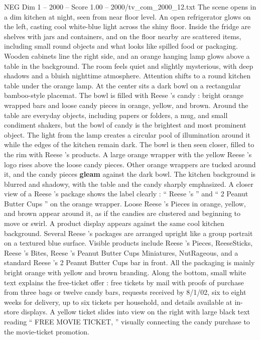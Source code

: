 \begin{textsample}{NEG Dim 1 – 2000 – Score 1.00 – 2000/tv\_com\_2000\_12.txt}  \label{ex:f1_neg_070}
The scene opens in a dim kitchen at night, seen from near floor level.
An open refrigerator glows on the left, casting cool white-blue light across the shiny floor.
Inside the fridge are shelves with jars and containers, and on the floor nearby are scattered items, including small round objects and what looks like spilled food or packaging.
Wooden cabinets line the right side, and an orange hanging lamp glows above a table in the background.
The room feels quiet and slightly mysterious, with deep shadows and a bluish nighttime atmosphere.
Attention shifts to a round kitchen table under the orange lamp.
At the center sits a dark bowl on a rectangular bamboo-style placemat.
The bowl is filled with Reese ’s candy : bright orange wrapped bars and loose candy pieces in orange, yellow, and brown.
Around the table are everyday objects, including papers or folders, a mug, and small condiment shakers, but the bowl of candy is the brightest and most prominent object.
The light from the lamp creates a circular pool of illumination around it while the edges of the kitchen remain dark.
The bowl is then seen closer, filled to the rim with Reese ’s products.
A large orange wrapper with the yellow Reese ’s logo rises above the loose candy pieces.
Other orange wrappers are tucked around it, and the candy pieces \textbf{gleam} against the dark bowl.
The kitchen background is blurred and shadowy, with the table and the candy sharply emphasized.
A closer view of a Reese ’s package shows the label clearly : “ Reese ’s ” and “ 2 Peanut Butter Cups ” on the orange wrapper.
Loose Reese ’s Pieces in orange, yellow, and brown appear around it, as if the candies are clustered and beginning to move or swirl.
A product display appears against the same cool kitchen background.
Several Reese ’s packages are arranged upright like a group portrait on a textured blue surface.
Visible products include Reese ’s Pieces, ReeseSticks, Reese ’s Bites, Reese ’s Peanut Butter Cups Miniatures, NutRageous, and a standard Reese ’s 2 Peanut Butter Cups bar in front.
All the packaging is mainly bright orange with yellow and brown branding.
Along the bottom, small white text explains the free-ticket offer : free tickets by mail with proofs of purchase from three bags or twelve candy bars, requests received by 8/1/02, six to eight weeks for delivery, up to six tickets per household, and details available at in-store displays.
A yellow ticket slides into view on the right with large black text reading “ FREE MOVIE TICKET, ” visually connecting the candy purchase to the movie-ticket promotion.

\end{textsample}

